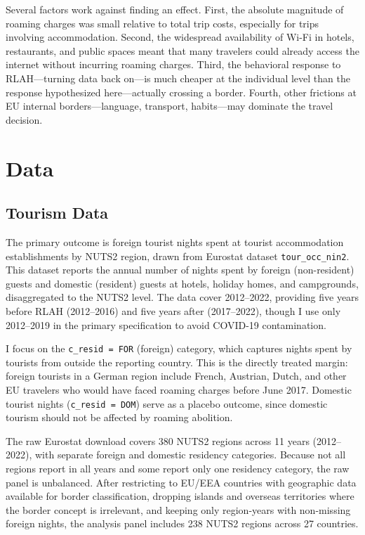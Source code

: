 \documentclass[12pt]{article}
\begin{document}
Several factors work against finding an effect. First, the absolute magnitude of roaming charges was small relative to total trip costs, especially for trips involving accommodation. Second, the widespread availability of Wi-Fi in hotels, restaurants, and public spaces meant that many travelers could already access the internet without incurring roaming charges. Third, the behavioral response to RLAH---turning data back on---is much cheaper at the individual level than the response hypothesized here---actually crossing a border. Fourth, other frictions at EU internal borders---language, transport, habits---may dominate the travel decision.


\section{Data}

\subsection{Tourism Data}

The primary outcome is foreign tourist nights spent at tourist accommodation establishments by NUTS2 region, drawn from Eurostat dataset \texttt{tour\_occ\_nin2}. This dataset reports the annual number of nights spent by foreign (non-resident) guests and domestic (resident) guests at hotels, holiday homes, and campgrounds, disaggregated to the NUTS2 level. The data cover 2012--2022, providing five years before RLAH (2012--2016) and five years after (2017--2022), though I use only 2012--2019 in the primary specification to avoid COVID-19 contamination.

I focus on the \texttt{c\_resid = FOR} (foreign) category, which captures nights spent by tourists from outside the reporting country. This is the directly treated margin: foreign tourists in a German region include French, Austrian, Dutch, and other EU travelers who would have faced roaming charges before June 2017. Domestic tourist nights (\texttt{c\_resid = DOM}) serve as a placebo outcome, since domestic tourism should not be affected by roaming abolition.

The raw Eurostat download covers 380 NUTS2 regions across 11 years (2012--2022), with separate foreign and domestic residency categories. Because not all regions report in all years and some report only one residency category, the raw panel is unbalanced. After restricting to EU/EEA countries with geographic data available for border classification, dropping islands and overseas territories where the border concept is irrelevant, and keeping only region-years with non-missing foreign nights, the analysis panel includes 238 NUTS2 regions across 27 countries.
\end{document}
